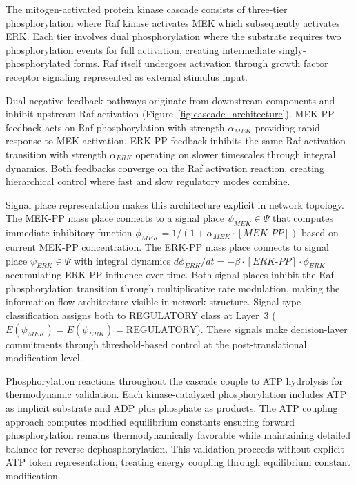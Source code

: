 \documentclass[twocolumn,11pt]{article}
\begin{document}
The mitogen-activated protein kinase cascade consists of three-tier phosphorylation where Raf kinase activates MEK which subsequently activates ERK. Each tier involves dual phosphorylation where the substrate requires two phosphorylation events for full activation, creating intermediate singly-phosphorylated forms. Raf itself undergoes activation through growth factor receptor signaling represented as external stimulus input.

Dual negative feedback pathways originate from downstream components and inhibit upstream Raf activation (Figure~\ref{fig:cascade_architecture}). MEK-PP feedback acts on Raf phosphorylation with strength $\alpha_{MEK}$ providing rapid response to MEK activation. ERK-PP feedback inhibits the same Raf activation transition with strength $\alpha_{ERK}$ operating on slower timescales through integral dynamics. Both feedbacks converge on the Raf activation reaction, creating hierarchical control where fast and slow regulatory modes combine.

Signal place representation makes this architecture explicit in network topology. The MEK-PP mass place connects to a signal place $\psi_{MEK} \in \Psi$ that computes immediate inhibitory function $\phi_{MEK} = 1/(1 + \alpha_{MEK} \cdot [MEK\text{-}PP])$ based on current MEK-PP concentration. The ERK-PP mass place connects to signal place $\psi_{ERK} \in \Psi$ with integral dynamics $d\phi_{ERK}/dt = -\beta \cdot [ERK\text{-}PP] \cdot \phi_{ERK}$ accumulating ERK-PP influence over time. Both signal places inhibit the Raf phosphorylation transition through multiplicative rate modulation, making the information flow architecture visible in network structure. {\small Signal type classification assigns both to REGULATORY class at Layer~3 ($E(\psi_{MEK}) = E(\psi_{ERK}) = \text{REGULATORY}$).} These signals make decision-layer commitments through threshold-based control at the post-translational modification level.

Phosphorylation reactions throughout the cascade couple to ATP hydrolysis for thermodynamic validation. Each kinase-catalyzed phosphorylation includes ATP as implicit substrate and ADP plus phosphate as products. The ATP coupling approach computes modified equilibrium constants ensuring forward phosphorylation remains thermodynamically favorable while maintaining detailed balance for reverse dephosphorylation. This validation proceeds without explicit ATP token representation, treating energy coupling through equilibrium constant modification.
\end{document}
